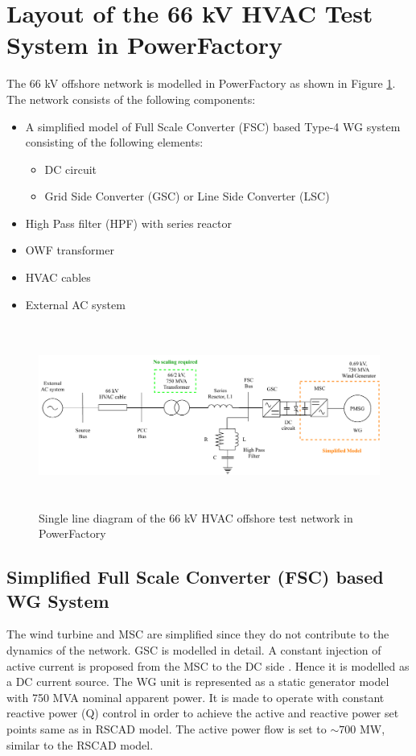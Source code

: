 \section{Layout of the 66 kV HVAC Test System in PowerFactory}

The 66 kV offshore network is modelled in PowerFactory as shown in Figure \ref{fig:WT1_Model_PFD_comp}. The network consists of the following components:

\begin{itemize}
    \item A simplified model of Full Scale Converter (\gls{FSC}) based Type-4 \gls{WG} system consisting of the following elements:
    \begin{itemize}
        \item \gls{DC} circuit
        \item Grid Side Converter (\gls{GSC}) or Line Side Converter (\gls{LSC})
    \end{itemize}
    \item High Pass filter (\gls{HPF}) with series reactor
    \item \gls{OWF} transformer
    \item \gls{HVAC} cables  
    \item External \gls{AC} system
\end{itemize}

\begin{figure}[H]
    \includegraphics[height = 6cm,width = \textwidth]{Diagrams/Chapter_3/WT1_AC_PFD.pdf}
    \caption{Single line diagram of the 66 kV HVAC offshore test network in PowerFactory}
    \label{fig:WT1_Model_PFD_comp}
\end{figure}

\subsection{Simplified Full Scale Converter (FSC) based WG System}\label{simplified_FSC_WG}
The wind turbine and \gls{MSC} are simplified since they do not contribute to the dynamics of the network. \gls{GSC} is modelled in detail. A constant injection of active current is proposed from the \gls{MSC} to the \gls{DC} side \cite{korai_dynamic_2019}. Hence it is modelled as a \gls{DC} current source. The \gls{WG} unit is represented as a static generator model with 750 MVA nominal apparent power. It is made to operate with constant reactive power (Q) control in order to achieve the active and reactive power set points same as in RSCAD model. The active power flow is set to $\sim{700}$ MW, similar to the RSCAD model.

